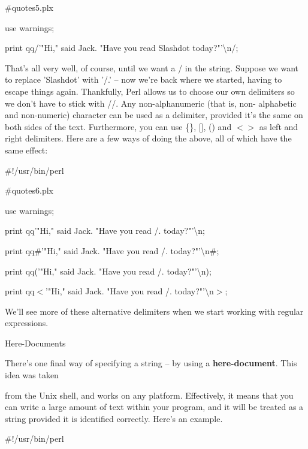 \documentclass[a4paper,11pt]{book}
\begin{document}
\noindent \#quotes5.plx

\noindent use warnings;

\noindent print qq/'"Hi," said Jack. "Have you read Slashdot today?"'\textbackslash n/;

\noindent 

\noindent That's all very well, of course, until we want a / in the string. Suppose we want to replace 'Slashdot' with '/.' -- now we're back where we started, having to escape things again. Thankfully, Perl allows us to choose our own delimiters so we don't have to stick with //. Any non-alphanumeric (that is, non- alphabetic and non-numeric) character can be used as a delimiter, provided it's the same on both sides  of the text. Furthermore, you can use \{\}, [], () and $<$$>$ as left and right delimiters. Here are a few ways of doing the above, all of which have the same effect:

\noindent 

\noindent \#!/usr/bin/perl

\noindent \#quotes6.plx

\noindent use warnings;

\noindent print qq\textbar '"Hi," said Jack. "Have you read /. today?"'\textbackslash n\textbar ;

\noindent print qq\#'"Hi," said Jack. "Have you read /. today?"'\textbackslash n\#;

\noindent print qq('"Hi," said Jack. "Have you read /. today?"'\textbackslash n);

\noindent print qq$<$'"Hi," said Jack. "Have you read /. today?"'\textbackslash n$>$;

\noindent 

\noindent We'll see more of these alternative delimiters when we start working with regular expressions.

\noindent 

\noindent Here-Documents

\noindent 

\noindent There's one final way of  specifying  a  string  --  by using  a  \textbf{here-document}.  This  idea  was  taken

\noindent from the Unix  shell,  and works  on  any  platform.  Effectively,  it  means  that  you  can  write  a  large amount of text within  your program,  and  it  will  be  treated  as  a  string  provided  it  is  identified correctly.  Here's an example.

\noindent 

\noindent \#!/usr/bin/perl
\end{document}
